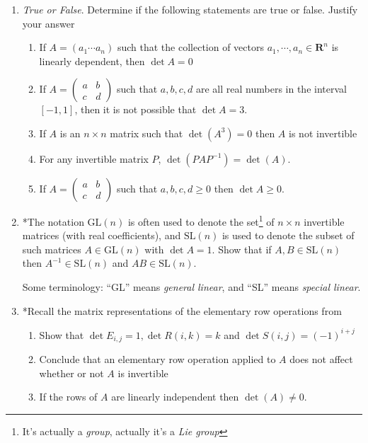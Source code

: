 \documentclass[12pt]{article}
\numberwithin{equation}{subsection}
\numberwithin{figure}{subsection}
\theoremstyle{note}
\newcommand\GL[1]{\mathrm{GL}(#1)}
\newcommand\SL[1]{\mathrm{SL}(#1)}
\begin{document}
\begin{enumerate}[label=\arabic*.]
\item \textit{True or False}. Determine if the following statements are true or false. Justify your answer
\begin{enumerate}
	\item If $A=(a_1 \cdots a_n)$ such that the collection of vectors $a_1, \cdots, a_n\in\mathbf{R}^n$ is linearly dependent, then $\det A=0$
	\item If $A=\begin{pmatrix} a & b \\ c & d\end{pmatrix}$ such that $a,b,c,d$ are all real numbers in the interval $[-1,1]$, then it is not possible that $\det A=3$. 
	\item If $A$ is an $n\times n$ matrix such that $\det(A^3)=0$ then $A$ is not invertible
	\item For any invertible matrix $P$, $\det(PAP^{-1})=\det(A)$. 
	\item If $A=\begin{pmatrix} a & b \\ c & d\end{pmatrix}$ such that $a,b,c,d\geq 0$ then $\det A\geq 0$.
	\end{enumerate}

\item *The notation $\GL{n}$ is often used to denote the set\footnote{It's actually a \textit{group}, actually it's a \textit{Lie group}} of $n\times n$ invertible matrices (with real coefficients), and $\SL{n}$ is used to denote the subset of such matrices $A\in \GL{n}$ with $\det A=1$. Show that if $A,B\in \SL{n}$ then $A^{-1}\in \SL{n}$ and $AB\in \SL{n}$. 

Some terminology:  ``GL'' means \textit{general linear}, and ``SL'' means \textit{special linear}.

\item *Recall the matrix representations of the elementary row operations from 
\begin{enumerate}
	\item Show that $\det E_{i,j}=1, \det R(i,k)=k$ and $\det S(i,j)=(-1)^{i+j}$
	\item Conclude that an elementary row operation applied to $A$ does not affect whether or not $A$ is invertible 
	\item If the rows of $A$ are linearly independent then $\det(A)\neq 0$.
	\end{enumerate}
\end{enumerate}
\end{document}
